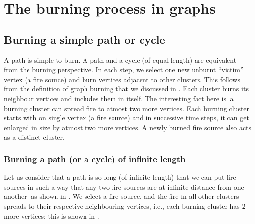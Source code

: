 \chapter{The burning process in graphs}\label{chapter:graph-burning-examples}

\section{Burning a simple path or cycle}\label{section:burn-path}

A path is simple to burn. A path and a cycle (of equal length) are equivalent from the burning perspective. In each step, we select one new unburnt ``victim'' vertex (a fire source) and burn vertices adjacent to other clusters. This follows from the definition of graph burning that we discussed in . Each cluster burns its neighbour vertices and includes them in itself. The interesting fact here is, a burning cluster can spread fire to atmost two more vertices. Each burning cluster starts with on single vertex (a fire source) and in successive time steps, it can get enlarged in size by atmost two more vertices. A newly burned fire source also acts as a distinct cluster.

\subsection{Burning a path (or a cycle) of infinite length}

 Let us consider that a path is so long (of infinite length) that we can put fire sources in such a way that any two fire sources are at infinite distance from one another, as shown in . We select a fire source, and the fire in all other clusters spreads to their respective neighbouring vertices, i.e., each burning cluster has $2$ more vertices; this is shown in .

